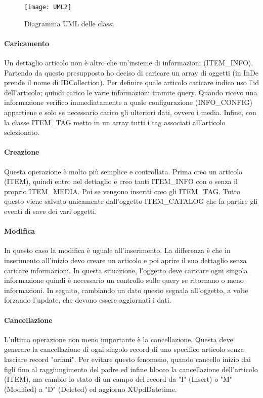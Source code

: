 \begin{figure}[!h] 
	\centering 
	\texttt{[image: UML2]} 
	\caption{Diagramma UML delle classi}
	\label{UML}
\end{figure}

\paragraph{Caricamento}
Un dettaglio articolo non è altro che un'insieme di informazioni (ITEM\_INFO). Partendo da questo presupposto ho deciso di caricare un array di oggetti (in InDe prende il nome di IDCollection).
Per definire quale articolo caricare indico uso l'id dell'articolo; quindi carico le varie informazioni tramite query. Quando ricevo una informazione verifico immediatamente a quale configurazione (INFO\_CONFIG) appartiene e solo se necessario carico gli ulteriori dati, ovvero i media. Infine, con la classe ITEM\_TAG metto in un array tutti i tag associati all'articolo selezionato.

\paragraph{Creazione}
Questa operazione è molto più semplice e controllata. Prima creo un articolo (ITEM), quindi entro nel dettaglio e creo tanti ITEM\_INFO con o senza il proprio ITEM\_MEDIA. Poi se vengono inseriti creo gli ITEM\_TAG. Tutto questo viene salvato unicamente dall'oggetto ITEM\_CATALOG che fa partire gli eventi di save dei vari oggetti.

\paragraph{Modifica}
In questo caso la modifica è uguale all'inserimento. La differenza è che in inserimento all'inizio devo creare un articolo e poi aprire il suo dettaglio senza caricare informazioni. In questa situazione, l'oggetto deve caricare ogni singola informazione quindi è necessario un controllo sulle query se ritornano o meno informazioni. In seguito, cambiando un dato questo segnala all'oggetto, a volte forzando l'update, che devono essere aggiornati i dati.

\paragraph{Cancellazione}
L'ultima operazione non meno importante è la cancellazione. Questa deve generare la cancellazione di ogni singolo record di uno specifico articolo senza lasciare record "orfani". Per evitare questo fenomeno, quando cancello inizio dai figli fino al raggiungimento del padre ed infine blocco la cancellazione dell'articolo (ITEM), ma cambio lo stato di un campo del record da "I" (Insert) o "M"(Modified) a "D" (Deleted) ed aggiorno XUpdDatetime.


